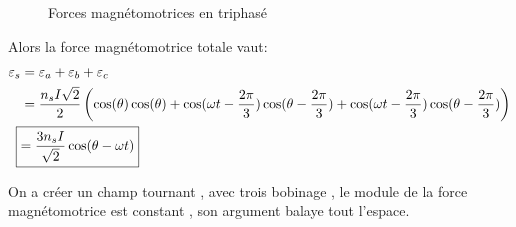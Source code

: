 \documentclass[main.tex]{subfiles}
\renewcommand{\epsilon}{\varepsilon}
\begin{document}
\begin{figure}[H]
  \centering
  \caption{Forces magnétomotrices en triphasé}
\end{figure}
Alors la force magnétomotrice totale vaut:
\begin{align*}
  \epsilon_s &=\epsilon_a +\epsilon_b+\epsilon_c \\
      &= \frac{n_sI\sqrt{2}}{2}\left(
        \cos(\theta)\cos(\theta)   + \cos(\omega t-\frac{2\pi}{3})\cos(\theta-\frac{2\pi}{3})
 +\cos(\omega t-\frac{2\pi}{3})\cos(\theta-\frac{2\pi}{3})
        \right)\\
       \Aboxed{ &= \frac{3n_sI}{\sqrt{2}} \cos(\theta-\omega t)}
\end{align*}

On a créer un champ tournant , avec trois bobinage , le module de la force magnétomotrice est constant , son argument balaye tout l'espace.
\end{document}
